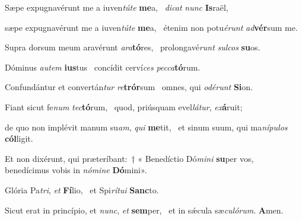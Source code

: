 \item Sæpe expugnavérunt me a iuven\textit{túte} \textbf{me}a,~\psstar{} \textit{dicat} \textit{nunc} \textbf{Is}raël,

\item sæpe expugnavérunt me a iuven\textit{túte} \textbf{me}a,~\psstar{} étenim non potu\textit{érunt} \textit{ad}\textbf{vér}sum me.

\item Supra dorsum meum aravérunt \textit{ara}\textbf{tó}res,~\psstar{} prolongavé\textit{runt} \textit{sulcos} \textbf{su}os.

\item Dóminus \textit{autem} \textbf{ius}tus~\psstar{} concídit cerví\textit{ces} \textit{pecca}\textbf{tó}rum.

\item Confundántur et convertán\textit{tur} \textit{re}\textbf{trór}sum~\psstar{} omnes, qui \textit{odérunt} \textbf{Si}on.

\item Fiant sicut fe\textit{num} \textit{tec}\textbf{tó}rum,~\psstar{} quod, priúsquam evel\textit{látur}, \textit{ex}\textbf{á}ruit;

\item de quo non implévit manum su\textit{am}, \textit{qui} \textbf{me}tit,~\psstar{} et sinum suum, qui ma\textit{nípulos} \textbf{cól}ligit.

\item Et non dixérunt, qui præteríbant:~† « Benedíctio Dó\textit{mini} \textbf{su}per vos,~\psstar{} benedícimus vobis in \textit{nómine} \textbf{Dó}mini».

\item Glória Pa\textit{tri}, \textit{et} \textbf{Fí}lio,~\psstar{} et Spi\textit{rítui} \textbf{Sanc}to.

\item Sicut erat in princípio, et \textit{nunc}, \textit{et} \textbf{sem}per,~\psstar{} et in sǽcula sæ\textit{culórum}. \textbf{A}men.